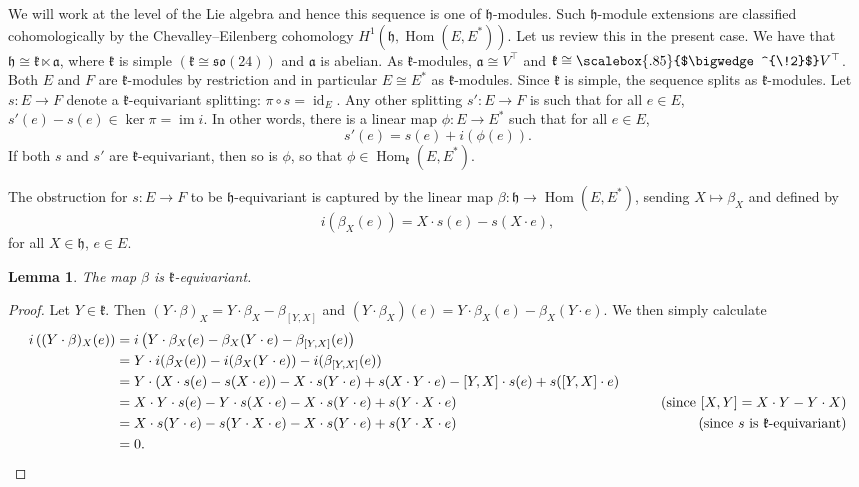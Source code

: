 \documentclass[11pt,reqno,a4paper,final]{amsart}
\newcommand\ext[1]{\scalebox{.85}{$\bigwedge^{\!#1}$}}
\theoremstyle{plain}
\newtheorem{lemma}{Lemma}
\theoremstyle{definition}
\newcommand{\h}{\mathfrak{h}}
\newcommand{\fa}{\mathfrak{a}}
\newcommand{\fk}{\mathfrak{k}}
\newcommand{\so}{\mathfrak{so}}
\newcommand{\id}{\operatorname{id}}
\newcommand{\1}{\mathbb{1}}
\newcommand{\Hom}{\operatorname{Hom}}
\newcommand{\im}{\operatorname{im}}
\numberwithin{equation}{section}
\begin{document}
\begin{appendices}
We will work at the level of the Lie algebra and hence this sequence
is one of $\h$-modules.   Such $\h$-module extensions are classified
cohomologically by the Chevalley--Eilenberg cohomology $H^1(\h,
\Hom(E,E^*))$.  Let us review this in the present case.  We have that
$\h \cong \fk \ltimes \fa$, where $\fk$ is simple $(\fk \cong
\so(24))$ and $\fa$ is abelian.  As $\fk$-modules, $\fa \cong V^\top$
and $\fk \cong \ext{2} V^\top$.  Both $E$ and $F$ are $\fk$-modules by
restriction and in particular $E \cong  E^*$ as $\fk$-modules.  Since
$\fk$ is simple, the sequence splits as $\fk$-modules.  Let $s \colon
E \to F$ denote a $\fk$-equivariant splitting: $\pi \circ s = \id_E$.
Any other splitting $s' \colon E \to F$ is such that for all $e \in
E$, $s'(e) - s(e) \in \ker \pi = \im i$.  In other words, there is
a linear map $\phi \colon E \to E^*$ such that for all $e \in E$,
\begin{equation}
  \label{eq:new-splitting}
  s'(e) = s(e) + i (\phi(e)).
\end{equation}
If both $s$ and $s'$ are $\fk$-equivariant, then so is $\phi$, so that
$\phi \in \Hom_{\fk}(E,E^*)$.

The obstruction for $s \colon E \to F$ to be $\h$-equivariant is
captured by the linear map $\beta \colon \h \to \Hom(E,E^*)$, sending
$X \mapsto \beta_X$ and defined by
\begin{equation}
  i (\beta_X(e)) = X \cdot s(e) - s(X \cdot e),
\end{equation}
for all $X \in \h$, $e \in E$.

\begin{lemma}
  The map $\beta$ is $\fk$-equivariant.
\end{lemma}

\begin{proof}
  Let $Y \in \fk$.  Then $(Y \cdot \beta)_X = Y \cdot \beta_X -
  \beta_{[Y,X]}$ and $(Y \cdot \beta_X)(e) = Y \cdot \beta_X(e) -
  \beta_X(Y\cdot e)$.  We then simply calculate
  \begin{align*}
    i \left( (Y \cdot \beta)_X(e)  \right) &= i\left( Y \cdot \beta_X(e) - \beta_X (Y\cdot e)  - \beta_{[Y,X]}(e)\right)\\
       &= Y \cdot i (\beta_X(e)) - i (\beta_X(Y\cdot e)) - i (\beta_{[Y,X]}(e))\\
       &= Y \cdot (X \cdot s(e)-s(X\cdot e)) - X \cdot s(Y \cdot e) + s(X \cdot Y\cdot e) - [Y,X]\cdot s(e) + s([Y,X]\cdot e)\\
       &= X \cdot Y \cdot s(e) - Y \cdot s (X\cdot e) - X \cdot s (Y\cdot e) + s(Y\cdot X \cdot e) & \tag{since $[X,Y] = X \cdot Y - Y \cdot X$}\\
       &= X \cdot s(Y\cdot e) - s(Y \cdot X \cdot e) - X \cdot s(Y \cdot e) + s (Y\cdot X \cdot e) & \tag{since $s$ is $\fk$-equivariant}\\
       &= 0.
  \end{align*}
\end{proof}


\end{appendices}
\end{document}
